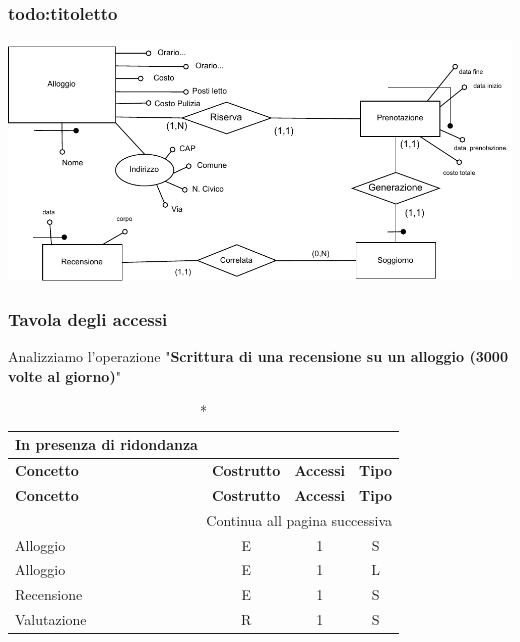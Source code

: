 \subsubsection{todo:titoletto}
\includegraphics[width=\textwidth]{resources/page6.pdf}

\subsubsection{Tavola degli accessi}
Analizziamo l'operazione "\textbf{Scrittura di una recensione su un alloggio (3000 volte al giorno)}"

\small
\setlength\extrarowheight{2pt}
\begin{longtable}{|lccc|}
    \caption*{In presenza di ridondanza}                                             \\

    \hline \textbf{Concetto} & \textbf{Costrutto} & \textbf{Accessi} & \textbf{Tipo} \\\hline
    \endfirsthead

    \hline \textbf{Concetto} & \textbf{Costrutto} & \textbf{Accessi} & \textbf{Tipo} \\\hline
    \endhead

    \hline \multicolumn{4}{|r|}{{Continua all pagina successiva}}                    \\\hline
    \endfoot

    \hline
    \endlastfoot
    Alloggio                 & E                  & 1                & S             \\%
    Alloggio                 & E                  & 1                & L             \\%
    Recensione               & E                  & 1                & S             \\%
    Valutazione              & R                  & 1                & S             \\%
\end{longtable}
\normalsize

